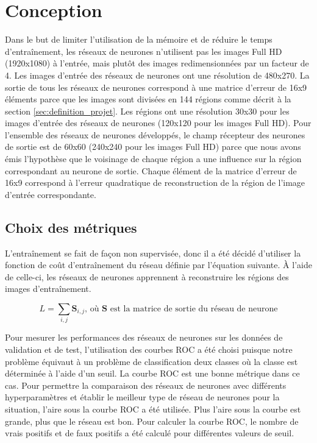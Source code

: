 \section{Conception}
    Dans le but de limiter l'utilisation de la mémoire et de réduire le temps d'entraînement, les réseaux de neurones n'utilisent pas les images Full HD (1920x1080) à l'entrée, mais plutôt des images redimensionnées par un facteur de 4. Les images d'entrée des réseaux de neurones ont une résolution de 480x270. La sortie de tous les réseaux de neurones correspond à une matrice d'erreur de 16x9 éléments parce que les images sont divisées en 144 régions comme décrit à la section \ref{sec:definition_projet}. Les régions ont une résolution 30x30 pour les images d'entrée des réseaux de neurones (120x120 pour les images Full HD). Pour l'ensemble des réseaux de neurones développés, le champ récepteur des neurones de sortie est de 60x60 (240x240 pour les images Full HD) parce que nous avons émis l'hypothèse que le voisinage de chaque région a une influence sur la région correspondant au neurone de sortie. Chaque élément de la matrice d'erreur de 16x9 correspond à l'erreur quadratique de reconstruction de la région de l'image d'entrée correspondante. 

\subsection{Choix des métriques}
    L'entraînement se fait de façon non supervisée, donc il  a été décidé d'utiliser la fonction de coût d'entraînement du réseau définie par l'équation suivante. À l'aide de celle-ci, les réseaux de neurones apprennent à reconstruire les régions des images d'entraînement.
    
    \begin{equation}
        L = \sum_{i,j} \mathbf{S}_{i,j} \text{, où } \mathbf{S} \text{ est la matrice de sortie du réseau de neurone}
    \end{equation}
    
    Pour mesurer les performances des réseaux de neurones sur les données de validation et de test, l'utilisation des courbes ROC a été choisi puisque notre problème équivaut à un problème de classification deux classes où la classe est déterminée à l'aide d'un seuil. La courbe ROC est une bonne métrique dans ce cas. Pour permettre la comparaison des réseaux de neurones avec différents hyperparamètres et établir le meilleur type de réseau de neurones pour la situation, l'aire sous la courbe ROC a été utilisée. Plus l'aire sous la courbe est grande, plus que le réseau est bon. Pour calculer la courbe ROC, le nombre de vrais positifs et de faux positifs a été calculé pour différentes valeurs de seuil.

